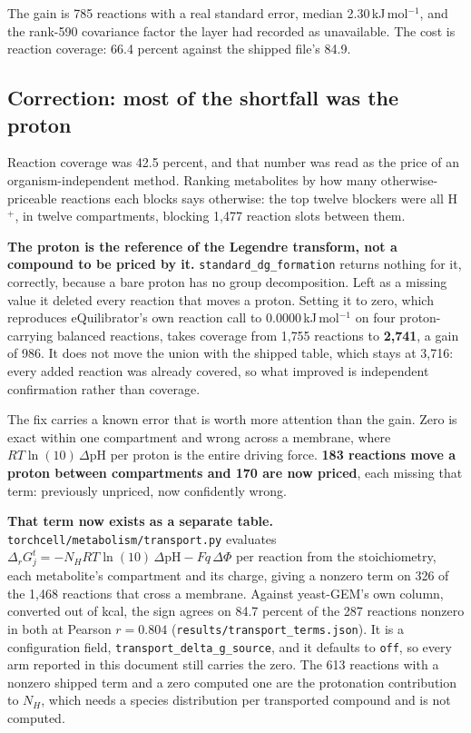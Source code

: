 The gain is 785 reactions with a real standard error, median 2.30\,kJ\,mol$^{-1}$, and the
rank-590 covariance factor the layer had recorded as unavailable. The cost is reaction
coverage: 66.4 percent against the shipped file's 84.9.

\subsection{Correction: most of the shortfall was the proton}

Reaction coverage was 42.5 percent, and that number was read as the price of an
organism-independent method. Ranking metabolites by how many otherwise-priceable reactions
each blocks says otherwise: the top twelve blockers were all H$^+$, in twelve compartments,
blocking 1{,}477 reaction slots between them.

\textbf{The proton is the reference of the Legendre transform, not a compound to be priced
by it.} \texttt{standard\_dg\_formation} returns nothing for it, correctly, because a bare
proton has no group decomposition. Left as a missing value it deleted every reaction that
moves a proton. Setting it to zero, which reproduces eQuilibrator's own reaction call to
0.0000\,kJ\,mol$^{-1}$ on four proton-carrying balanced reactions, takes coverage from
1{,}755 reactions to \textbf{2{,}741}, a gain of 986. It does not move the union with the
shipped table, which stays at 3{,}716: every added reaction was already covered, so what
improved is independent confirmation rather than coverage.

The fix carries a known error that is worth more attention than the gain. Zero is exact
within one compartment and wrong across a membrane, where $RT\ln(10)\,\Delta\mathrm{pH}$
per proton is the entire driving force. \textbf{183 reactions move a proton between
compartments and 170 are now priced}, each missing that term: previously unpriced, now
confidently wrong.

\textbf{That term now exists as a separate table.}
\texttt{torchcell/metabolism/transport.py} evaluates
$\Delta_r G^t_j = -N_H RT\ln(10)\,\Delta\mathrm{pH} - Fq\,\Delta\Phi$ per reaction from the
stoichiometry, each metabolite's compartment and its charge, giving a nonzero term on 326
of the 1{,}468 reactions that cross a membrane. Against yeast-GEM's own column, converted
out of kcal, the sign agrees on 84.7 percent of the 287 reactions nonzero in both at
Pearson $r = 0.804$ (\texttt{results/transport\_terms.json}). It is a configuration field,
\texttt{transport\_delta\_g\_source}, and it defaults to \texttt{off}, so every arm reported
in this document still carries the zero. The 613 reactions with a nonzero shipped term and a
zero computed one are the protonation contribution to $N_H$, which needs a species
distribution per transported compound and is not computed.


